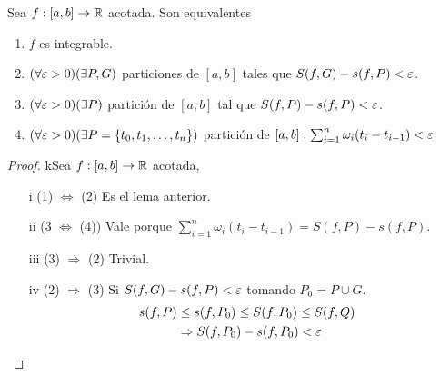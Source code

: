 \begin{theorem}
  Sea \(f: [a, b] \to \mathbb{R} \) acotada. Son equivalentes \begin{enumerate}
    \item \(f\) es integrable.
    \item \((\forall \varepsilon > 0)(\exists P, G)\) particiones de \([a, b]\) tales que \(S(f, G) - s(f, P) < \varepsilon \).
    \item \((\forall \varepsilon > 0)(\exists P)\) partición de \([a, b]\) tal que \(S(f, P) - s(f, P) < \varepsilon \).
    \item \((\forall \varepsilon > 0)(\exists P = \{ t_0, t_1, \ldots, t_n \})\) partición de \([a, b] : \sum_{i = 1}^n \omega_i (t_i - t_{i-1}) < \varepsilon \)
  \end{enumerate}

  \begin{proof}
    kSea \(f: [a,b] \to \mathbb{R} \) acotada,
    \begin{enumerate}
      \item[i] (1) \(\iff \) (2) Es el lema anterior.
      \item[ii] (3 \(\iff \) (4)) Vale porque \(\sum_{i = 1}^n \omega_i (t_i - t_{i-1}) = S(f, P) - s(f, P)\).
      \item[iii] (3) \(\Rightarrow \) (2) Trivial.
      \item[iv] (2) \(\Rightarrow \) (3) Si \(S(f, G) - s(f, P) < \varepsilon \) tomando \(P_0 = P \cup G\).\begin{align*}
              s(f, P) & \leq s(f, P_0) \leq S(f, P_0) \leq S(f, Q) \\
                      & \Rightarrow S(f, P_0) - s(f, P_0) < \varepsilon
            \end{align*}
    \end{enumerate}
  \end{proof}
\end{theorem}

\clearpage


